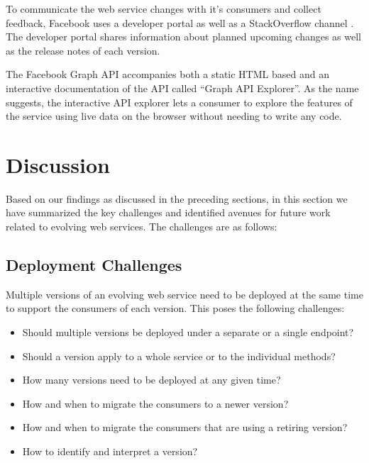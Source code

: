 \documentclass[runningheads,a4paper]{llncs}
\begin{document}
To communicate the web service changes with it’s consumers and collect feedback, Facebook uses a developer portal as well as a StackOverflow channel \cite{facebook_stack_overflow}. The developer portal shares information about planned upcoming changes as well as the release notes of each version.

The Facebook Graph API accompanies both a static HTML based and an interactive documentation of the API called ``Graph API Explorer''. As the name suggests, the interactive API explorer lets a consumer to explore the features of the service using live data on the browser without needing to write any code.



\section{Discussion} %
\label{sec:discussion}

Based on our findings as discussed in the preceding sections, in this section we have summarized the key challenges and identified avenues for future work related to evolving web services. The challenges are as follows:

\subsection{Deployment Challenges} %
\label{sub:deployment_challenges}

Multiple versions of an evolving web service need to be deployed at the same time to support the consumers of each version. This poses the following challenges:
\begin{itemize}
  \item Should multiple versions be deployed under a separate or a single endpoint?
  \item Should a version apply to a whole service or to the individual methods?
  \item How many versions need to be deployed at any given time?
  \item How and when to migrate the consumers to a newer version?
  \item How and when to migrate the consumers that are using a retiring version?
  \item How to identify and interpret a version?
\end{itemize}
\end{document}
